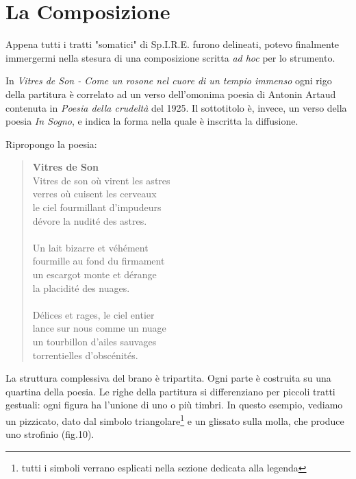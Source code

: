 
\chapter{La Composizione}
\label{chp:La Composizione}
Appena tutti i tratti "somatici" di Sp.I.R.E. furono delineati, potevo finalmente immergermi nella stesura di una composizione scritta \textit{ad hoc} per lo strumento.

In \textit{Vitres de Son - Come un rosone nel cuore di un tempio immenso} ogni rigo della partitura è correlato ad un verso dell'omonima poesia di Antonin Artaud contenuta in \textit{Poesia della crudeltà} del 1925. Il sottotitolo è, invece, un verso della poesia \textit{In Sogno}, e indica la forma nella quale è inscritta la diffusione. 

Ripropongo la poesia:

\begin{quotation}
\textbf{Vitres de Son} \\
Vitres de son où virent les astres \\
verres où cuisent les cerveaux \\
le ciel fourmillant d'impudeurs \\
dévore la nudité des astres. \\ \\
Un lait bizarre et véhément \\
fourmille au fond du firmament \\
un escargot monte et dérange \\
la placidité des nuages. \\ \\
Délices et rages, le ciel entier \\
lance sur nous comme un nuage \\
un tourbillon d'ailes sauvages \\
torrentielles d'obscénités.\\
\end{quotation}

La struttura complessiva del brano è tripartita. Ogni parte è costruita su una quartina della poesia. Le righe della partitura si differenziano per piccoli tratti gestuali: ogni figura ha l'unione di uno o più timbri. In questo esempio, vediamo un pizzicato, dato dal simbolo triangolare\footnote{tutti i simboli verrano esplicati nella sezione dedicata alla legenda} e un glissato sulla molla, che produce uno strofinio (fig.10). 

